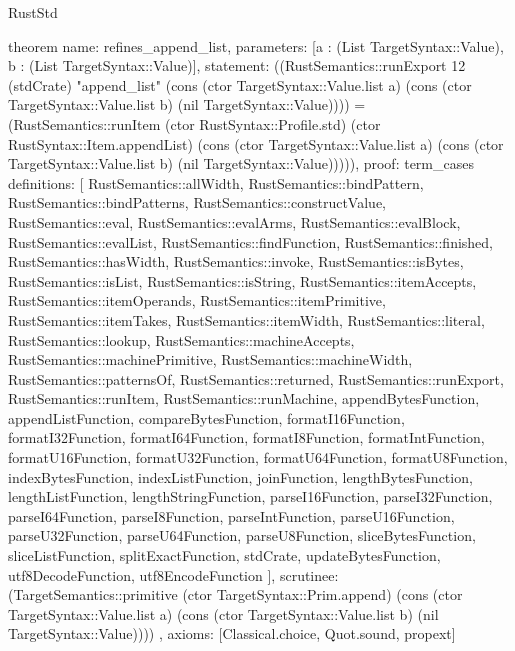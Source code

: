 \begin{lexlean}{RustStd}
\begin{semanticmodule}
theorem{
  name: refines_append_list,
  parameters: [a : (List TargetSyntax::Value), b : (List TargetSyntax::Value)],
  statement: ((RustSemantics::runExport 12 (stdCrate) "append_list" (cons (ctor TargetSyntax::Value.list a) (cons (ctor TargetSyntax::Value.list b) (nil TargetSyntax::Value)))) = (RustSemantics::runItem (ctor RustSyntax::Profile.std) (ctor RustSyntax::Item.appendList) (cons (ctor TargetSyntax::Value.list a) (cons (ctor TargetSyntax::Value.list b) (nil TargetSyntax::Value))))),
  proof: term_cases{
    definitions: [
      RustSemantics::allWidth,
      RustSemantics::bindPattern,
      RustSemantics::bindPatterns,
      RustSemantics::constructValue,
      RustSemantics::eval,
      RustSemantics::evalArms,
      RustSemantics::evalBlock,
      RustSemantics::evalList,
      RustSemantics::findFunction,
      RustSemantics::finished,
      RustSemantics::hasWidth,
      RustSemantics::invoke,
      RustSemantics::isBytes,
      RustSemantics::isList,
      RustSemantics::isString,
      RustSemantics::itemAccepts,
      RustSemantics::itemOperands,
      RustSemantics::itemPrimitive,
      RustSemantics::itemTakes,
      RustSemantics::itemWidth,
      RustSemantics::literal,
      RustSemantics::lookup,
      RustSemantics::machineAccepts,
      RustSemantics::machinePrimitive,
      RustSemantics::machineWidth,
      RustSemantics::patternsOf,
      RustSemantics::returned,
      RustSemantics::runExport,
      RustSemantics::runItem,
      RustSemantics::runMachine,
      appendBytesFunction,
      appendListFunction,
      compareBytesFunction,
      formatI16Function,
      formatI32Function,
      formatI64Function,
      formatI8Function,
      formatIntFunction,
      formatU16Function,
      formatU32Function,
      formatU64Function,
      formatU8Function,
      indexBytesFunction,
      indexListFunction,
      joinFunction,
      lengthBytesFunction,
      lengthListFunction,
      lengthStringFunction,
      parseI16Function,
      parseI32Function,
      parseI64Function,
      parseI8Function,
      parseIntFunction,
      parseU16Function,
      parseU32Function,
      parseU64Function,
      parseU8Function,
      sliceBytesFunction,
      sliceListFunction,
      splitExactFunction,
      stdCrate,
      updateBytesFunction,
      utf8DecodeFunction,
      utf8EncodeFunction
    ],
    scrutinee: (TargetSemantics::primitive (ctor TargetSyntax::Prim.append) (cons (ctor TargetSyntax::Value.list a) (cons (ctor TargetSyntax::Value.list b) (nil TargetSyntax::Value))))
  },
  axioms: [Classical.choice, Quot.sound, propext]
}


\end{semanticmodule}
\end{lexlean}
